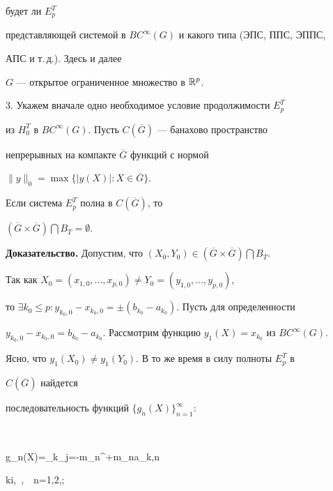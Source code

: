 будет ли $E^T_p$


представляющей системой в $BC^\infty(G)$ и какого типа (ЭПС, ППС, ЭППС,


АПС и т.\,д.). Здесь и далее


$G$ --- открытое ограниченное множество в $\Bbb{R}^p$.


\medskip





3. Укажем вначале одно необходимое условие продолжимости $E^T_p$


из $H^T_0$ в $BC^\infty(G)$. Пусть $C(\overline{G})$ --- банахово пространство


непрерывных на компакте $\overline{G}$ функций с нормой


$\|y\|_0=\max\{|y(X)|:X\in\overline{G}\}$.








\begin{thm}


Если система $E^T_p$ полна в $C(\overline{G})$, то


$(\overline{G}\times \overline{G})\bigcap B_T=\emptyset$.


\end{thm}








{\bf Доказательство.} Допустим, что $(X_0,


Y_0)\in(\overline{G}\times\overline{G})\bigcap B_T$.


Так как $X_0=(x_{1,0},\dotsc, x_{p,0})\ne Y_0=(y_{1,0},\dotsc,y_{p,0})$,


то $\exists k_0\le p:


y_{k_0,0}-x_{k_0,0}=\pm(b_{k_0}-a_{k_0})$. Пусть для определенности


$y_{k_0,0}-x_{k_0,0}=


b_{k_0}-a_{k_0}$. Рассмотрим функцию $y_1(X)=x_{k_0}$ из $BC^\infty(G)$.


Ясно, что $y_1(X_0)\ne y_1(Y_0)$. В то же время в силу полноты $E^T_p$ в


$C(\overline{G})$ найдется


последовательность функций $\{g_n(X)\}_{n=1}^\infty$:


$$


g_n(X)=\sum_{k_j=-m_n}^{+m_n}a_{k,n}\exp\big{}\pi


ki,\ \big\rangle,\ \ n=1,2,\dotsc;


